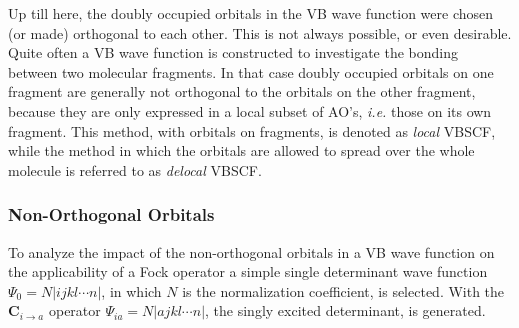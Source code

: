 Up till here, the doubly occupied orbitals in the VB wave function were chosen (or made) orthogonal to each other. This is not always possible, or even desirable. Quite often a VB wave function is constructed to investigate the bonding between two molecular fragments. In that case doubly occupied orbitals on one fragment are generally not orthogonal to the orbitals on the other fragment, because they are only expressed in a local subset of AO's, \textit{i.e.} those on its own fragment. This method, with orbitals on fragments, is denoted as \textit{local} VBSCF, while the method in which the orbitals are allowed to spread over the whole molecule is referred to as \textit{delocal} VBSCF.

\subsubsection{Non-Orthogonal Orbitals}

To analyze the impact of the non-orthogonal orbitals in a VB wave function on the applicability of a Fock operator a simple single determinant wave function $\Psi_0 = N |ijkl \cdots n|$, in which $N$ is the normalization coefficient,  is selected. With the $\mathbf{C}_{i \rightarrow a}$ operator $\Psi_{ia} = N |ajkl \cdots n|$,  the singly excited determinant, is generated.

